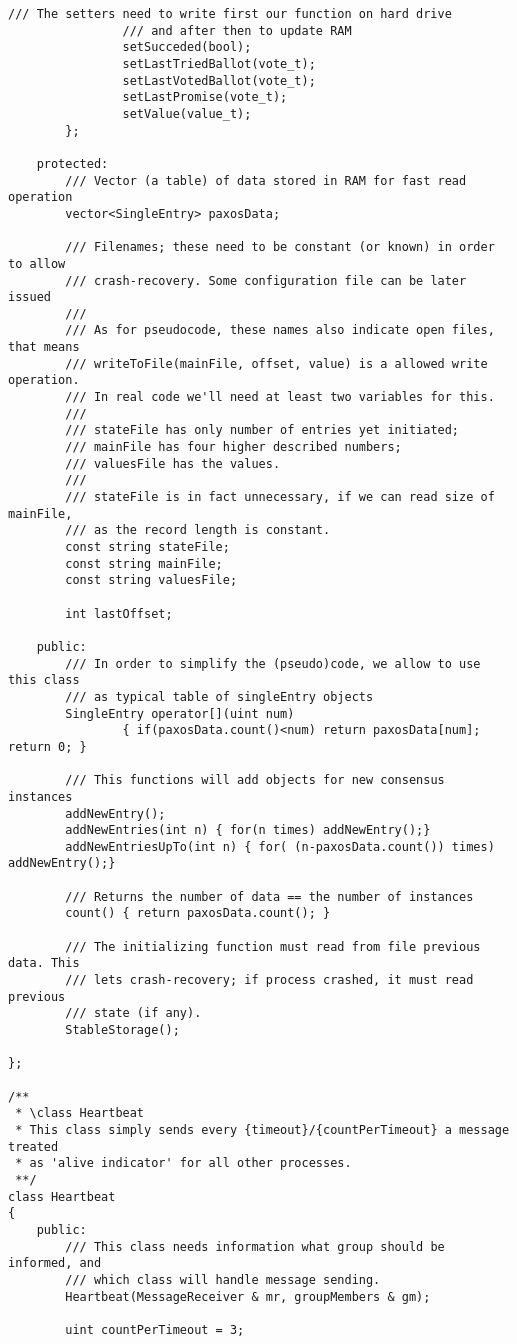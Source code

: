 \begin{lstlisting}[frame=lines,caption=Pseudocode of Paxos algorithm]
				/// The setters need to write first our function on hard drive
				/// and after then to update RAM
				setSucceded(bool);
				setLastTriedBallot(vote_t);
				setLastVotedBallot(vote_t);
				setLastPromise(vote_t);
				setValue(value_t);
		};

	protected:
		/// Vector (a table) of data stored in RAM for fast read operation
		vector<SingleEntry> paxosData;

		/// Filenames; these need to be constant (or known) in order to allow
		/// crash-recovery. Some configuration file can be later issued
		///
		/// As for pseudocode, these names also indicate open files, that means
		/// writeToFile(mainFile, offset, value) is a allowed write operation.
		/// In real code we'll need at least two variables for this.
		///
		/// stateFile has only number of entries yet initiated;
		/// mainFile has four higher described numbers;
		/// valuesFile has the values.
		///
		/// stateFile is in fact unnecessary, if we can read size of mainFile,
		/// as the record length is constant.
		const string stateFile;
		const string mainFile;
		const string valuesFile;

		int lastOffset;

	public:
		/// In order to simplify the (pseudo)code, we allow to use this class
		/// as typical table of singleEntry objects
		SingleEntry operator[](uint num)
				{ if(paxosData.count()<num) return paxosData[num]; return 0; }

		/// This functions will add objects for new consensus instances
		addNewEntry();
		addNewEntries(int n) { for(n times) addNewEntry();}
		addNewEntriesUpTo(int n) { for( (n-paxosData.count()) times) addNewEntry();}

		/// Returns the number of data == the number of instances
		count() { return paxosData.count(); }

		/// The initializing function must read from file previous data. This
		/// lets crash-recovery; if process crashed, it must read previous
		/// state (if any).
		StableStorage();

};

/**
 * \class Heartbeat
 * This class simply sends every {timeout}/{countPerTimeout} a message treated
 * as 'alive indicator' for all other processes.
 **/
class Heartbeat
{
	public:
		/// This class needs information what group should be informed, and
		/// which class will handle message sending.
		Heartbeat(MessageReceiver & mr, groupMembers & gm);
		
		uint countPerTimeout = 3;
	

\end{lstlisting}
